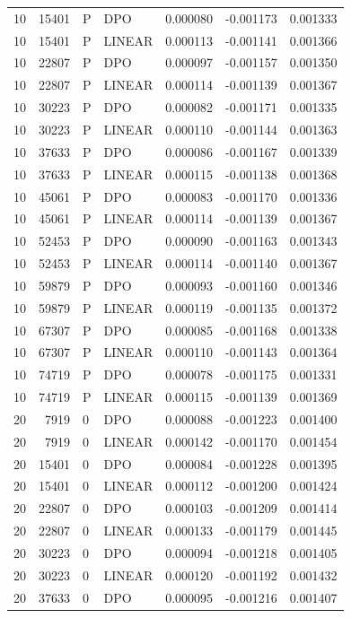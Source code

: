 \begin{longtable}{rrllrrr}
10 & 15401 & P & DPO & 0.000080 & -0.001173 & 0.001333\\
10 & 15401 & P & LINEAR & 0.000113 & -0.001141 & 0.001366\\
10 & 22807 & P & DPO & 0.000097 & -0.001157 & 0.001350\\
10 & 22807 & P & LINEAR & 0.000114 & -0.001139 & 0.001367\\
10 & 30223 & P & DPO & 0.000082 & -0.001171 & 0.001335\\
10 & 30223 & P & LINEAR & 0.000110 & -0.001144 & 0.001363\\
10 & 37633 & P & DPO & 0.000086 & -0.001167 & 0.001339\\
10 & 37633 & P & LINEAR & 0.000115 & -0.001138 & 0.001368\\
10 & 45061 & P & DPO & 0.000083 & -0.001170 & 0.001336\\
10 & 45061 & P & LINEAR & 0.000114 & -0.001139 & 0.001367\\
10 & 52453 & P & DPO & 0.000090 & -0.001163 & 0.001343\\
10 & 52453 & P & LINEAR & 0.000114 & -0.001140 & 0.001367\\
10 & 59879 & P & DPO & 0.000093 & -0.001160 & 0.001346\\
10 & 59879 & P & LINEAR & 0.000119 & -0.001135 & 0.001372\\
10 & 67307 & P & DPO & 0.000085 & -0.001168 & 0.001338\\
10 & 67307 & P & LINEAR & 0.000110 & -0.001143 & 0.001364\\
10 & 74719 & P & DPO & 0.000078 & -0.001175 & 0.001331\\
10 & 74719 & P & LINEAR & 0.000115 & -0.001139 & 0.001369\\
20 & 7919 & 0 & DPO & 0.000088 & -0.001223 & 0.001400\\
20 & 7919 & 0 & LINEAR & 0.000142 & -0.001170 & 0.001454\\
20 & 15401 & 0 & DPO & 0.000084 & -0.001228 & 0.001395\\
20 & 15401 & 0 & LINEAR & 0.000112 & -0.001200 & 0.001424\\
20 & 22807 & 0 & DPO & 0.000103 & -0.001209 & 0.001414\\
20 & 22807 & 0 & LINEAR & 0.000133 & -0.001179 & 0.001445\\
20 & 30223 & 0 & DPO & 0.000094 & -0.001218 & 0.001405\\
20 & 30223 & 0 & LINEAR & 0.000120 & -0.001192 & 0.001432\\
20 & 37633 & 0 & DPO & 0.000095 & -0.001216 & 0.001407\\

\end{longtable}
